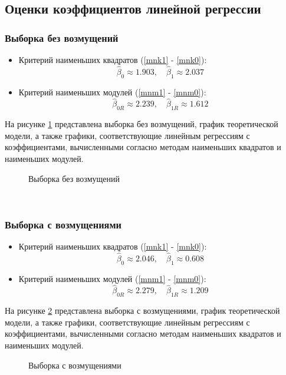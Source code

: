 \documentclass[12pt]{article}
\begin{document}
\newpage
\subsection{Оценки коэффициентов линейной регрессии}
\subsubsection{Выборка без возмущений}
\begin{itemize}
    \item Критерий наименьших квадратов (\ref{mnk1} - \ref{mnk0}):
        \[
            \hat{\beta}_0 \approx 1.903, \quad \hat{\beta}_1 \approx 2.037   
        \]
    \item Критерий наименьших модулей (\ref{mnm1} - \ref{mnm0}):
        \[
            \hat{\beta}_{0R} \approx 2.239, \quad \hat{\beta}_{1R} \approx 1.612
        \]
\end{itemize}
На рисунке \ref{noEmis} представлена выборка без возмущений, график теоретической модели, а также графики, соответствующие линейным регрессиям с коэффициентами, вычисленными согласно методам наименьших квадратов и наименьших модулей.\\
\begin{figure}[h]
    \begin{minipage}[h]{1\linewidth}
    \end{minipage}
    \caption{Выборка без возмущений}
    \label{noEmis}
\end{figure}
\phantom{0}\\
\subsubsection{Выборка с возмущениями}
\begin{itemize}
    \item Критерий наименьших квадратов (\ref{mnk1} - \ref{mnk0}):
        \[
            \hat{\beta}_0 \approx 2.046, \quad \hat{\beta}_1 \approx 0.608
        \]
    \item Критерий наименьших модулей (\ref{mnm1} - \ref{mnm0}):
        \[
            \hat{\beta}_{0R} \approx 2.279, \quad \hat{\beta}_{1R} \approx 1.209
        \]
\end{itemize}
На рисунке \ref{Emis} представлена выборка с возмущениями, график теоретической модели, а также графики, соответствующие линейным регрессиям с коэффициентами, вычисленными согласно методам наименьших квадратов и наименьших модулей.
\begin{figure}[h]
    \begin{minipage}[h]{1\linewidth}
    \end{minipage}
    \caption{Выборка с возмущениями}
    \label{Emis}
\end{figure}
\end{document}
